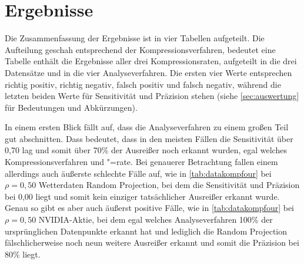 \section{Ergebnisse}
Die Zusammenfassung der Ergebnisse ist in vier Tabellen aufgeteilt. Die Aufteilung geschah entsprechend der Kompressionsverfahren, bedeutet eine Tabelle enthält die Ergebnisse aller drei Kompressionsraten, aufgeteilt in die drei Datensätze und in die vier Analyseverfahren. Die ersten vier Werte entsprechen richtig positiv, richtig negativ, falsch positiv und falsch negativ, während die letzten beiden Werte für Sensitivität und Präzision stehen (siehe \autoref{sec:auswertung} für Bedeutungen und Abkürzungen).

In einem ersten Blick fällt auf, dass die Analyseverfahren zu einem großen Teil gut abschnitten. Dass bedeutet, dass in den meisten Fällen die Sensitivität über 0,70 lag und somit über 70\% der Ausreißer noch erkannt wurden, egal welches Kompressionsverfahren und "=rate. Bei genauerer Betrachtung fallen einem allerdings auch äußerste schlechte Fälle auf, wie in \autoref{tab:datakompfour} bei $\rho=0,50$ Wetterdaten Random Projection, bei dem die Sensitivität und Präzision bei 0,00 liegt und somit kein einziger tatsächlicher Ausreißer erkannt wurde. Genau so gibt es aber auch äußerst positive Fälle, wie in \autoref{tab:datakompfour} bei $\rho=0,50$ NVIDIA-Aktie, bei dem egal welches Analyseverfahren 100\% der ursprünglichen Datenpunkte erkannt hat und lediglich die Random Projection fälschlicherweise noch neun weitere Ausreißer erkannt und somit die Präzision bei 80\% liegt.

